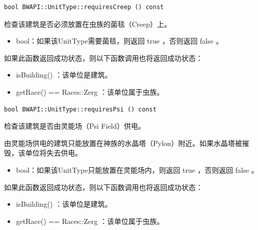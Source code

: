\begin{tcolorbox}[colback=white, colframe=black!60!white, title=requiresCreep(), arc=0mm]
    \begin{verbatim}
bool BWAPI::UnitType::requiresCreep () const
    \end{verbatim}
    检查该建筑是否必须放置在虫族的菌毯（Creep）上。
    \begin{return}
        \begin{itemize}
            \item bool：如果该UnitType需要菌毯，则返回   true  ，否则返回   false  。
        \end{itemize}
    \end{return}
    \begin{note}
        如果此函数返回成功状态，则以下函数调用也将返回成功状态：
        \begin{itemize}
            \item isBuilding()  ：该单位是建筑。
            \item getRace() == Races::Zerg  ：该单位属于虫族。
        \end{itemize}
    \end{note}
\end{tcolorbox}


\begin{tcolorbox}[colback=white, colframe=black!60!white, title=requiresPsi(), arc=0mm]
    \begin{verbatim}
bool BWAPI::UnitType::requiresPsi () const
    \end{verbatim}
    检查该建筑是否由灵能场（Psi Field）供电。
    \par 由灵能场供电的建筑只能放置在神族的水晶塔（Pylon）附近。如果水晶塔被摧毁，该单位将失去供电。
    \begin{return}
        \begin{itemize}
            \item bool：如果该UnitType只能放置在灵能场内，则返回   true  ，否则返回   false  。
        \end{itemize}
    \end{return}
    \begin{note}
        如果此函数返回成功状态，则以下函数调用也将返回成功状态：
        \begin{itemize}
            \item isBuilding()  ：该单位是建筑。
            \item getRace() == Races::Zerg  ：该单位属于虫族。
        \end{itemize}
    \end{note}
\end{tcolorbox}


